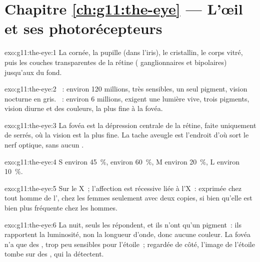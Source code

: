 \section*{Chapitre \ref{ch:g11:the-eye} --- L'œil et ses photorécepteurs}

\begin{solution}{exo:g11:the-eye:1}
La cornée, la pupille (dans l'iris), le cristallin, le corps vitré,
puis les couches transparentes de la rétine ( ganglionnaires et
bipolaires) jusqu'aux  du fond.
\end{solution}

\begin{solution}{exo:g11:the-eye:2}
~: environ 120 millions, très sensibles, un seul pigment,
vision nocturne en gris. ~: environ 6 millions, exigent une
lumière vive, trois pigments, vision diurne et des couleurs, la plus
fine à la fovéa.
\end{solution}

\begin{solution}{exo:g11:the-eye:3}
La fovéa est la dépression centrale de la rétine, faite uniquement de
 serrés, où la vision est la plus fine. La tache aveugle est
l'endroit d'où sort le nerf optique, sans aucun .
\end{solution}

\begin{solution}{exo:g11:the-eye:4}
 S environ 45~\%,  environ 60~\%,  M environ 20~\%,
 L environ 10~\%.
\end{solution}

\begin{solution}{exo:g11:the-eye:5}
Sur le  X~; l'affection est récessive liée à l'X~: exprimée
chez tout homme  de l', chez les femmes seulement avec
deux copies, si bien qu'elle est bien plus fréquente chez les hommes.
\end{solution}

\begin{solution}{exo:g11:the-eye:6}
La nuit, seuls les  répondent, et ils n'ont qu'un pigment~:
ils rapportent la luminosité, non la longueur d'onde, donc aucune
couleur. La fovéa n'a que des , trop peu sensibles pour l'étoile~;
regardée de côté, l'image de l'étoile tombe sur des , qui la
détectent.
\end{solution}

